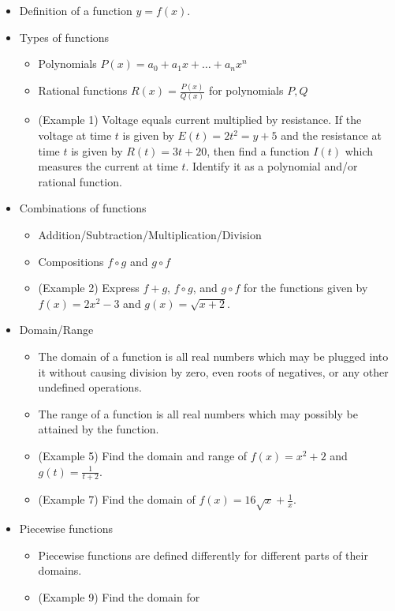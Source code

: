 \documentclass[11pt]{article}
\begin{document}
\begin{itemize}
\item Definition of a function \(y=f(x)\).
\item Types of functions
  \begin{itemize}
    \item Polynomials \(P(x)=a_0+a_1x+\dots+a_nx^n\)
    \item Rational functions \(R(x)=\frac{P(x)}{Q(x)}\) for polynomials \(P,Q\)
    \item (Example 1) Voltage equals current multiplied by resistance. If the
          voltage at time \(t\) is given by \(E(t)=2t^2=y+5\) and the
          resistance at time \(t\) is given by \(R(t)=3t+20\), then find
          a function \(I(t)\) which measures the current at time \(t\).
          Identify it as a polynomial and/or rational function.
  \end{itemize}
\item Combinations of functions
  \begin{itemize}
    \item Addition/Subtraction/Multiplication/Division
    \item Compositions \(f\circ g\) and \(g\circ f\)
    \item (Example 2) Express \(f+g\), \(f\circ g\), and
          \(g\circ f\) for the functions
          given by \(f(x)=2x^2-3\) and \(g(x)=\sqrt{x+2}\).
  \end{itemize}
\item Domain/Range
  \begin{itemize}
    \item The domain of a function is all real numbers which may be plugged
          into it without causing division by zero, even roots of negatives,
          or any other undefined operations.
    \item The range of a function is all real numbers which may possibly
          be attained by the function.
    \item (Example 5) Find the domain and range of \(f(x)=x^2+2\) and
          \(g(t)=\frac{1}{t+2}\).
    \item (Example 7) Find the domain of \(f(x)=16\sqrt x+\frac{1}{x}\).
  \end{itemize}
\item Piecewise functions
  \begin{itemize}
    \item Piecewise functions are defined differently for different parts of
          their domains.
    \item (Example 9) Find the domain for

\end{itemize}
\end{itemize}
\end{document}
